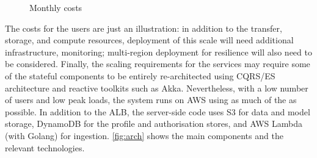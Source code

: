 \begin{figure}[h]
  \caption{Monthly costs}
  \label{plot:monthly-costs}
\end{figure}

The costs for the  users are just an illustration: in addition to the transfer, storage, and compute resources, deployment of this scale will need additional infrastructure, monitoring; multi-region deployment for resilience will also need to be considered. Finally, the scaling requirements for the services may require some of the stateful components to be entirely re-architected using CQRS/ES architecture and reactive toolkits such as Akka\cite{akka}. Nevertheless, with a low number of users and low peak loads, the system runs on AWS using as much of the  as possible. In addition to the ALB, the server-side code uses S3 for data and model storage, DynamoDB for the profile and authorisation stores, and AWS Lambda (with Golang) for ingestion. \autoref{fig:arch} shows the main components and the relevant technologies.


